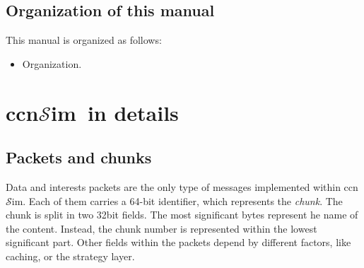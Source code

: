 \documentclass{article}
\newcommand{\ccnsim}{ccn$\mathcal{S}$im}
\begin{document}
\subsection{Organization of this manual}
This manual is organized as follows:
\begin{itemize}
    \item Organization.
\end{itemize}


\section{\ccnsim\ in details}
\subsection{Packets and chunks}
Data and interests packets are the only type of messages implemented within \ccnsim. Each of them carries a 64-bit identifier, which represents the  \emph{chunk}. The chunk is split in two 32bit fields. The most significant bytes represent he name of the content. Instead, the chunk number is represented  within the lowest significant part. Other fields within the packets depend by different factors, like caching, or the strategy layer.
\end{document}
